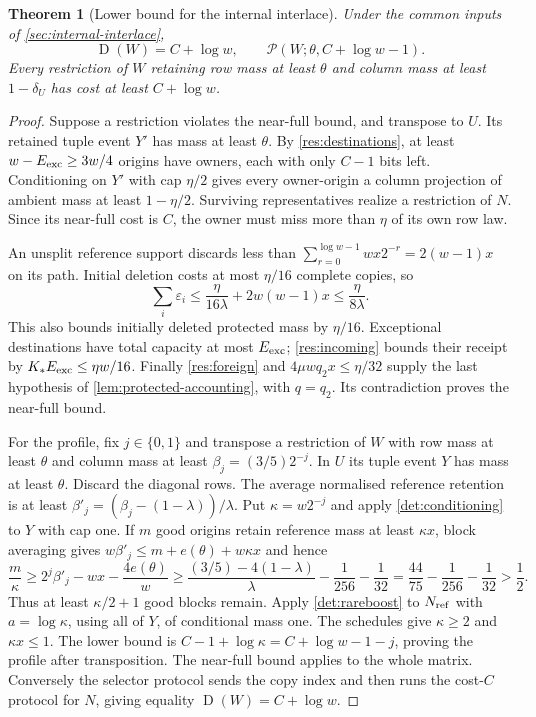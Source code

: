 \documentclass[11pt]{article} \usepackage[utf8]{inputenc}
\theoremstyle{plain} \newtheorem{theorem}{Theorem}[section]
\theoremstyle{definition} \newaliascnt{definition}{theorem}
\newcommand{\D}{\operatorname{D}}
\newcommand{\RP}[3]{\mathcal{P}(#1;#2,#3)}
\begin{document}
\begin{theorem}[Lower bound for the internal interlace]\label{res:alignment}
Under the common inputs of \cref{sec:internal-interlace},
\[
 \D(W)=C+\log w,\qquad \RP{W}{\theta}{C+\log w-1}.
\]
Every restriction of $W$ retaining row mass at least $\theta$ and column
mass at least $1-\delta_U$ has cost at least $C+\log w$.
\end{theorem}
\begin{proof}
Suppose a restriction violates the near-full bound, and transpose to $U$.
Its retained tuple event $Y'$ has mass at least $\theta$.
By \cref{res:destinations}, at least $w-E_{\rm exc}\ge3w/4$ origins
have owners, each with only $C-1$ bits left. Conditioning on $Y'$ with
cap $\eta/2$ gives every owner-origin a column projection of ambient
mass at least $1-\eta/2$. Surviving representatives realize a restriction
of $N$. Since its near-full cost is $C$, the owner must miss more than
$\eta$ of its own row law.

An unsplit reference support discards less than
$\sum_{r=0}^{\log w-1}wx2^{-r}=2(w-1)x$ on its path.
Initial deletion costs at most $\eta/16$ complete copies, so
\[
 \sum_i\varepsilon_i\le\frac{\eta}{16\lambda}+2w(w-1)x
 \le\frac{\eta}{8\lambda}.
\]
This also bounds initially deleted protected mass by $\eta/16$.
Exceptional destinations have total capacity at most $E_{\rm exc}$;
\cref{res:incoming} bounds their receipt by
$K_*E_{\rm exc}\le\eta w/16$.
Finally \cref{res:foreign} and $4\mu wq_2x\le\eta/32$ supply the
last hypothesis of \cref{lem:protected-accounting}, with $q=q_2$.
Its contradiction proves the near-full bound.

For the profile, fix $j\in\{0,1\}$ and transpose a restriction of $W$
with row mass at least $\theta$ and column mass at least
$\beta_j=(3/5)2^{-j}$. In $U$ its tuple event $Y$ has mass at least
$\theta$. Discard the diagonal rows. The average normalised reference
retention is at least $\beta'_j=(\beta_j-(1-\lambda))/\lambda$.
Put $\kappa=w2^{-j}$ and apply \cref{det:conditioning} to $Y$ with
cap one. If $m$ good origins retain reference mass at least $\kappa x$,
block averaging gives $w\beta'_j\le m+e(\theta)+w\kappa x$ and hence
\[
 \frac m\kappa\ge2^j\beta'_j-wx-\frac{4e(\theta)}w
 \ge\frac{(3/5)-4(1-\lambda)}\lambda-\frac1{256}-\frac1{32}
 =\frac{44}{75}-\frac1{256}-\frac1{32}>\frac12.
\]
Thus at least $\kappa/2+1$ good blocks remain. Apply
\cref{det:rareboost} to $N_{\rm ref}$ with $a=\log\kappa$, using all
of $Y$, of conditional mass one. The schedules give $\kappa\ge2$ and
$\kappa x\le1$. The lower bound is
$C-1+\log\kappa=C+\log w-1-j$, proving the profile after transposition.
The near-full bound applies to the whole matrix. Conversely the selector
protocol sends the copy index and then runs the cost-$C$ protocol for
$N$, giving equality $\D(W)=C+\log w$.
\end{proof}
\end{document}

